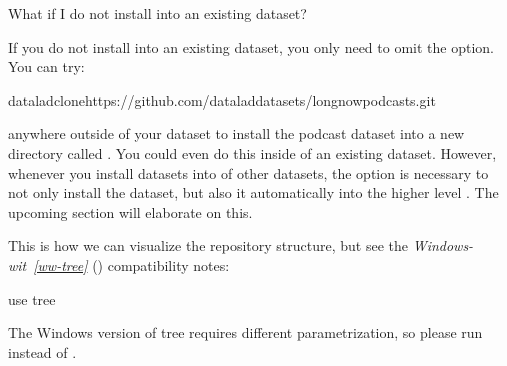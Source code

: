 \begin{findoutmore}[label={fom-no-clone-dataset}, before title={\thetcbcounter\ }, float, floatplacement=p, check odd page=true]{What if I do not install into an existing dataset?}
\label{\detokenize{basics/101-105-install:fom-no-clone-dataset}}

\sphinxAtStartPar
If you do not install into an existing dataset, you only need to omit the 
option. You can try:

\begin{sphinxVerbatim}[commandchars=\\\{\}]
dataladclonehttps://github.com/datalad\PYGZhy{}datasets/longnow\PYGZhy{}podcasts.git
\end{sphinxVerbatim}

\sphinxAtStartPar
anywhere outside of your  dataset to install the podcast dataset into a new directory
called . You could even do this inside of an existing dataset.
However, whenever you install datasets into of other datasets, the 
option is necessary to not only install the dataset, but also  it
automatically into the higher level . The upcoming section will
elaborate on this.


\end{findoutmore}

\sphinxAtStartPar
This is how we can visualize the repository structure, but see the \textit{Windows-wit}~{\windowswiticoninline}\textit{\ref{ww-tree}} {\hyperref[\detokenize{basics/101-105-install:ww-tree}]{}} ()
compatibility notes:

\ignorespaces \begin{windowswit}[label={ww-tree}, before title={\thetcbcounter\ }, float, floatplacement=p, check odd page=true]{use tree}
\label{\detokenize{basics/101-105-install:ww-tree}}

\sphinxAtStartPar
The Windows version of tree requires different parametrization, so please run  instead of .


\end{windowswit}

